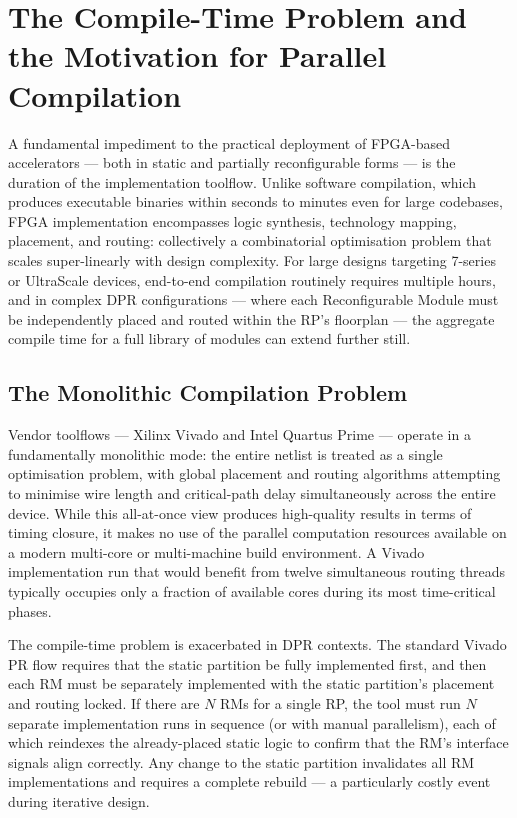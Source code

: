 \section{The Compile-Time Problem and the Motivation for Parallel Compilation}

A fundamental impediment to the practical deployment of FPGA-based accelerators — both in static and partially reconfigurable forms — is the duration of the implementation toolflow. Unlike software compilation, which produces executable binaries within seconds to minutes even for large codebases, FPGA implementation encompasses logic synthesis, technology mapping, placement, and routing: collectively a combinatorial optimisation problem that scales super-linearly with design complexity. For large designs targeting 7-series or UltraScale devices, end-to-end compilation routinely requires multiple hours, and in complex DPR configurations — where each Reconfigurable Module must be independently placed and routed within the RP's floorplan — the aggregate compile time for a full library of modules can extend further still.

\subsection{The Monolithic Compilation Problem}

Vendor toolflows — Xilinx Vivado and Intel Quartus Prime — operate in a fundamentally monolithic mode: the entire netlist is treated as a single optimisation problem, with global placement and routing algorithms attempting to minimise wire length and critical-path delay simultaneously across the entire device. While this all-at-once view produces high-quality results in terms of timing closure, it makes no use of the parallel computation resources available on a modern multi-core or multi-machine build environment. A Vivado implementation run that would benefit from twelve simultaneous routing threads typically occupies only a fraction of available cores during its most time-critical phases.

The compile-time problem is exacerbated in DPR contexts. The standard Vivado PR flow requires that the static partition be fully implemented first, and then each RM must be separately implemented with the static partition's placement and routing locked. If there are $N$ RMs for a single RP, the tool must run $N$ separate implementation runs in sequence (or with manual parallelism), each of which reindexes the already-placed static logic to confirm that the RM's interface signals align correctly. Any change to the static partition invalidates all RM implementations and requires a complete rebuild — a particularly costly event during iterative design.

